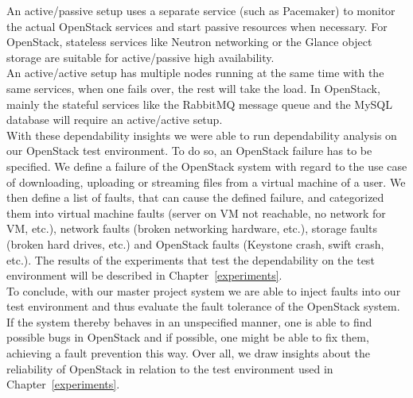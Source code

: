 An active/passive setup uses a separate service (such as Pacemaker) to monitor the actual OpenStack services and start passive resources when necessary. For OpenStack, stateless services like Neutron networking or the Glance object storage are suitable for active/passive high availability. \\

An active/active setup has multiple nodes running at the same time with the same services, when one fails over, the rest will take the load. In OpenStack, mainly the stateful services like the RabbitMQ message queue and the MySQL database will require an active/active setup. \\

With these dependability insights we were able to run dependability analysis on our OpenStack test environment. To do so, an OpenStack failure has to be specified. We define a failure of the OpenStack system with regard to the use case of downloading, uploading or streaming files from a virtual machine of a user. We then define a list of faults, that can cause the defined failure, and categorized them into virtual machine faults (server on VM not reachable, no network for VM, etc.), network faults (broken networking hardware, etc.), storage faults (broken hard drives, etc.) and OpenStack faults (Keystone crash, swift crash, etc.). The results of the experiments that test the dependability on the test environment will be described in Chapter~\ref{experiments}.\\

To conclude, with our master project system we are able to inject faults into our test environment and thus evaluate the fault tolerance of the OpenStack system. If the system thereby behaves in an unspecified manner, one is able to find possible bugs in OpenStack and if possible, one might be able to fix them, achieving a fault prevention this way. Over all, we draw insights about the reliability of OpenStack in relation to the test environment used in Chapter~\ref{experiments}.\\


